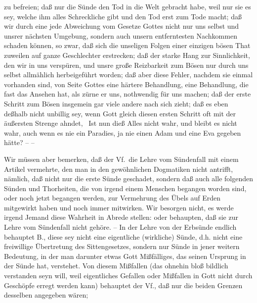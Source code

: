 zu befreien; daß nur die Sünde den Tod in die Welt gebracht habe, weil nur sie es sey, welche ihm alles Schreckliche gibt und den Tod erst zum Tode macht; daß wir durch eine jede Abweichung vom Gesetze Gottes nicht nur uns selbst und unsrer nächsten Umgebung, sondern auch unsern entferntesten Nachkommen schaden können, so zwar, daß sich die unseligen Folgen einer einzigen bösen That zuweilen auf ganze Geschlechter erstrecken; daß der starke Hang zur Sinnlichkeit, den wir in uns verspüren, und unsre große Reizbarkeit zum Bösen nur durch uns selbst allmählich herbeigeführt worden; daß aber diese Fehler, nachdem sie einmal vorhanden sind, von Seite Gottes eine härtere Behandlung, eine Behandlung, die fast das Ansehen hat, als zürne er uns, nothwendig für uns machen; daß der erste Schritt zum Bösen insgemein gar viele andere nach sich zieht; daß es eben deßhalb nicht unbillig sey, wenn Gott gleich diesen ersten Schritt oft mit der äußersten Strenge ahndet, \usw\ Ist nun dieß Alles nicht wahr, und bleibt es nicht wahr, auch wenn es nie ein Paradies, ja nie einen Adam und eine Eva gegeben hätte? -- --\par
Wir müssen aber bemerken, daß der Vf.\ die Lehre vom Sündenfall mit einem Artikel vermehrte, den man in den gewöhnlichen Dogmatiken nicht antrifft, nämlich, daß nicht nur die erste Sünde geschadet, sondern daß auch alle folgenden Sünden und Thorheiten, die von irgend einem Menschen begangen worden sind, oder noch jetzt begangen werden, zur Vermehrung des Übels auf Erden mitgewirkt haben und noch immer mitwirken. Wir besorgen nicht, es werde irgend Jemand diese Wahrheit in Abrede stellen: oder behaupten, daß sie zur Lehre vom Sündenfall nicht gehöre. -- In der Lehre von der Erbsünde endlich behauptet B., diese sey nicht eine eigentliche (wirkliche) Sünde, d.h. nicht eine freiwillige Übertretung des Sittengesetzes, sondern nur Sünde in jener weitern Bedeutung, in der man darunter etwas Gott Mißfälliges, das seinen Ursprung in der Sünde hat, verstehet. Von diesem Mißfallen (das ohnehin bloß bildlich verstanden seyn will, weil eigentliches Gefallen oder Mißfallen  in Gott nicht durch Geschöpfe erregt werden kann) behauptet der Vf., daß nur die beiden Grenzen desselben angegeben wären;  \par
